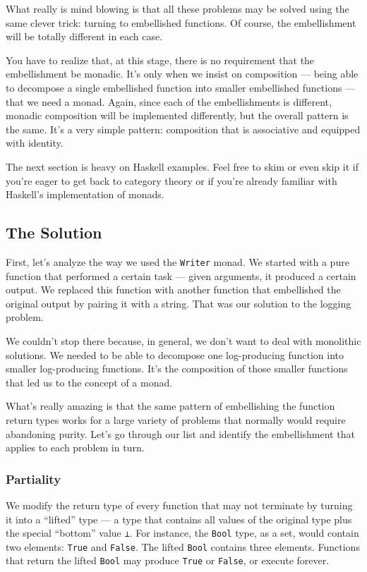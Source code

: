 What really is mind blowing is that all these problems may be solved
using the same clever trick: turning to embellished functions. Of
course, the embellishment will be totally different in each case.

You have to realize that, at this stage, there is no requirement that
the embellishment be monadic. It's only when we insist on composition
--- being able to decompose a single embellished function into smaller
embellished functions --- that we need a monad. Again, since each of the
embellishments is different, monadic composition will be implemented
differently, but the overall pattern is the same. It's a very simple
pattern: composition that is associative and equipped with identity.

The next section is heavy on Haskell examples. Feel free to skim or even
skip it if you're eager to get back to category theory or if you're
already familiar with Haskell's implementation of monads.

\subsection{The Solution}\label{the-solution}

First, let's analyze the way we used the \texttt{Writer} monad. We
started with a pure function that performed a certain task --- given
arguments, it produced a certain output. We replaced this function with
another function that embellished the original output by pairing it with
a string. That was our solution to the logging problem.

We couldn't stop there because, in general, we don't want to deal with
monolithic solutions. We needed to be able to decompose one
log-producing function into smaller log-producing functions. It's the
composition of those smaller functions that led us to the concept of a
monad.

What's really amazing is that the same pattern of embellishing the
function return types works for a large variety of problems that
normally would require abandoning purity. Let's go through our list and
identify the embellishment that applies to each problem in turn.

\subsubsection{Partiality}\label{partiality}

We modify the return type of every function that may not terminate by
turning it into a ``lifted'' type --- a type that contains all values of
the original type plus the special ``bottom'' value \texttt{⊥}. For
instance, the \texttt{Bool} type, as a set, would contain two elements:
\texttt{True} and \texttt{False}. The lifted \texttt{Bool} contains
three elements. Functions that return the lifted \texttt{Bool} may
produce \texttt{True} or \texttt{False}, or execute forever.

